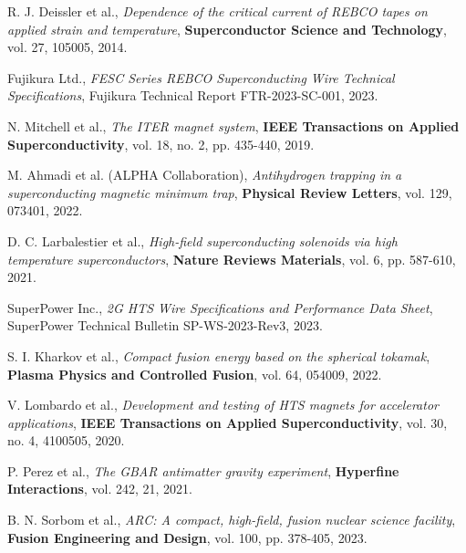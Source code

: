 \documentclass[12pt,a4paper]{article}
\begin{document}
\begin{thebibliography}{15}
R. J. Deissler et al.,
\emph{Dependence of the critical current of REBCO tapes on applied strain and temperature},
\textbf{Superconductor Science and Technology}, vol. 27, 105005, 2014.

Fujikura Ltd.,
\emph{FESC Series REBCO Superconducting Wire Technical Specifications},
Fujikura Technical Report FTR-2023-SC-001, 2023.

N. Mitchell et al.,
\emph{The ITER magnet system},
\textbf{IEEE Transactions on Applied Superconductivity}, vol. 18, no. 2, pp. 435-440, 2019.

M. Ahmadi et al. (ALPHA Collaboration),
\emph{Antihydrogen trapping in a superconducting magnetic minimum trap},
\textbf{Physical Review Letters}, vol. 129, 073401, 2022.

D. C. Larbalestier et al.,
\emph{High-field superconducting solenoids via high temperature superconductors},
\textbf{Nature Reviews Materials}, vol. 6, pp. 587-610, 2021.

SuperPower Inc.,
\emph{2G HTS Wire Specifications and Performance Data Sheet},
SuperPower Technical Bulletin SP-WS-2023-Rev3, 2023.

S. I. Kharkov et al.,
\emph{Compact fusion energy based on the spherical tokamak},
\textbf{Plasma Physics and Controlled Fusion}, vol. 64, 054009, 2022.

V. Lombardo et al.,
\emph{Development and testing of HTS magnets for accelerator applications},
\textbf{IEEE Transactions on Applied Superconductivity}, vol. 30, no. 4, 4100505, 2020.

P. Perez et al.,
\emph{The GBAR antimatter gravity experiment},
\textbf{Hyperfine Interactions}, vol. 242, 21, 2021.

B. N. Sorbom et al.,
\emph{ARC: A compact, high-field, fusion nuclear science facility},
\textbf{Fusion Engineering and Design}, vol. 100, pp. 378-405, 2023.

\end{thebibliography}
\end{document}
